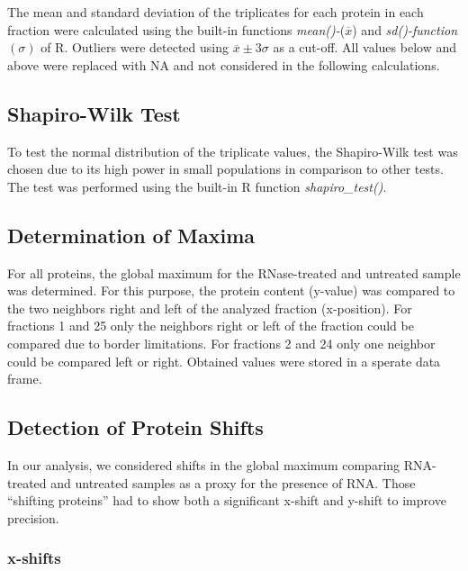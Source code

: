\documentclass[
]{article}
\begin{document}
The mean and standard deviation of the triplicates for each protein in
each fraction were calculated using the built-in functions
\emph{mean()-}(\(\overline x\)) and \emph{sd()-function}\((\sigma)\) of
R. Outliers were detected using \(\overline x \pm 3\sigma\) as a
cut-off. All values below and above were replaced with NA and not
considered in the following calculations.

\hypertarget{shapiro-wilk-test}{%
\subsection{Shapiro-Wilk Test}\label{shapiro-wilk-test}}

To test the normal distribution of the triplicate values, the
Shapiro-Wilk test was chosen due to its high power in small populations
in comparison to other tests. The test was performed using the built-in
R function \emph{shapiro\_test()}.

\hypertarget{determination-of-maxima}{%
\subsection{Determination of Maxima}\label{determination-of-maxima}}

For all proteins, the global maximum for the RNase-treated and untreated
sample was determined. For this purpose, the protein content (y-value)
was compared to the two neighbors right and left of the analyzed
fraction (x-position). For fractions 1 and 25 only the neighbors right
or left of the fraction could be compared due to border limitations. For
fractions 2 and 24 only one neighbor could be compared left or right.
Obtained values were stored in a sperate data frame.

\hypertarget{detection-of-protein-shifts}{%
\subsection{Detection of Protein
Shifts}\label{detection-of-protein-shifts}}

In our analysis, we considered shifts in the global maximum comparing
RNA-treated and untreated samples as a proxy for the presence of RNA.
Those ``shifting proteins'' had to show both a significant x-shift and
y-shift to improve precision.

\hypertarget{x-shifts}{%
\subsubsection{x-shifts}\label{x-shifts}}
\end{document}
